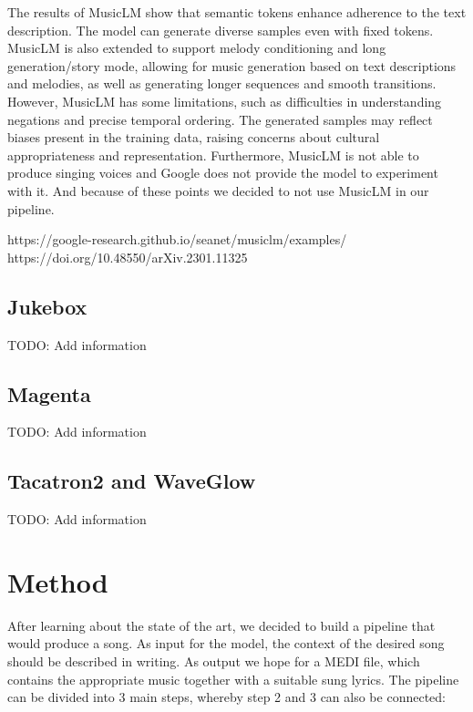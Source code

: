 The results of MusicLM show that semantic tokens enhance adherence to the text description. The model can generate diverse samples even with fixed tokens. MusicLM is also extended to support melody conditioning and long generation/story mode, allowing for music generation based on text descriptions and melodies, as well as generating longer sequences and smooth transitions.
However, MusicLM has some limitations, such as difficulties in understanding negations and precise temporal ordering. The generated samples may reflect biases present in the training data, raising concerns about cultural appropriateness and representation. Furthermore, MusicLM is not able to produce singing voices and Google does not provide the model to experiment with it. And because of these points we decided to not use MusicLM in our pipeline.

https://google-research.github.io/seanet/musiclm/examples/
https://doi.org/10.48550/arXiv.2301.11325


\section{Jukebox}
\label{sec:Jukebox}

TODO: Add information

\section{Magenta}
\label{sec:Magenta}

TODO: Add information

\section{Tacatron2 and WaveGlow}
\label{sec:Tacatron2_and_WaveGlow}

TODO: Add information


\chapter{Method}
\label{chap:method}

After learning about the state of the art, we decided to build a pipeline that would produce a song. As input for the model, the context of the desired song should be described in writing. As output we hope for a MEDI file, which contains the appropriate music together with a suitable sung lyrics. The pipeline can be divided into 3 main steps, whereby step 2 and 3 can also be connected:

